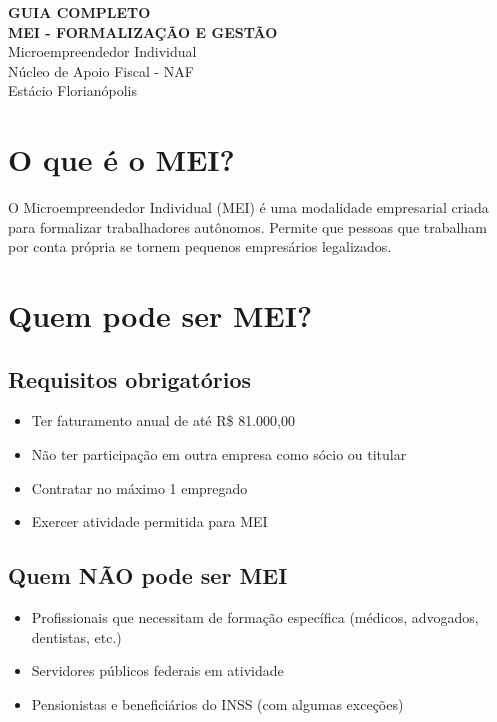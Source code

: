 \documentclass[12pt,a4paper]{article}
\begin{document}
\begin{center}
{\LARGE \textbf{GUIA COMPLETO}}\\[0.5cm]
{\Large \textbf{MEI - FORMALIZAÇÃO E GESTÃO}}\\[0.5cm]
{\large Microempreendedor Individual}\\[0.3cm]
{\large Núcleo de Apoio Fiscal - NAF}\\
{\large Estácio Florianópolis}\\[1cm]
\end{center}

\section{O que é o MEI?}

O Microempreendedor Individual (MEI) é uma modalidade empresarial criada para formalizar trabalhadores autônomos. Permite que pessoas que trabalham por conta própria se tornem pequenos empresários legalizados.

\section{Quem pode ser MEI?}

\subsection{Requisitos obrigatórios}
\begin{itemize}
    \item Ter faturamento anual de até R\$ 81.000,00
    \item Não ter participação em outra empresa como sócio ou titular
    \item Contratar no máximo 1 empregado
    \item Exercer atividade permitida para MEI
\end{itemize}

\subsection{Quem NÃO pode ser MEI}
\begin{itemize}
    \item Profissionais que necessitam de formação específica (médicos, advogados, dentistas, etc.)
    \item Servidores públicos federais em atividade
    \item Pensionistas e beneficiários do INSS (com algumas exceções)
\end{itemize}
\end{document}
